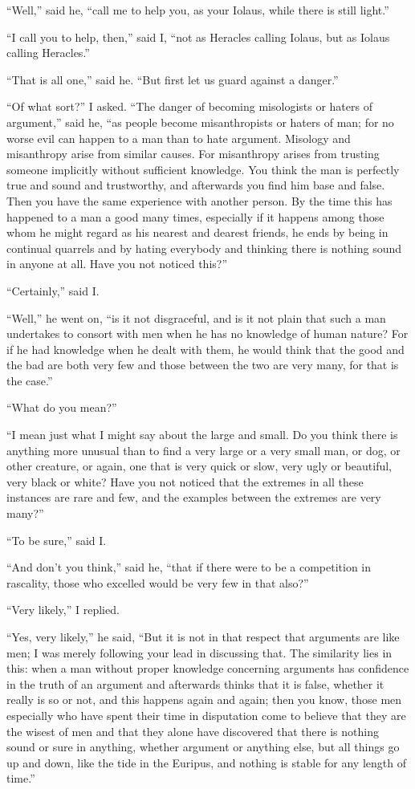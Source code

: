 \documentclass[letterpaper,12pt]{article}
\newcommand{\stephpag}[1]{\marginnote{\small\itshape\fontfamily{ppl}\selectfont #1}}
\begin{document}
\begin{drama}
``Well,'' said he, ``call me to help you, as your Iolaus, while there is still light.''
 
``I call you to help, then,'' said I, ``not as Heracles calling Iolaus, but as Iolaus calling Heracles.''
 
``That is all one,'' said he. ``But first let us guard against a danger.''
 
``Of what sort?'' I asked. \stephpag{d} ``The danger of becoming misologists or haters of argument,'' said he, ``as people become misanthropists or haters of man; for no worse evil can happen to a man than to hate argument. Misology and misanthropy arise from similar causes. For misanthropy arises from trusting someone implicitly without sufficient knowledge. You think the man is perfectly true and sound and trustworthy, and afterwards you find him base and false. Then you have the same experience with another person. By the time this has happened to a man a good many times, especially if it happens among those whom he might regard as his nearest \stephpag{e} and dearest friends, he ends by being in continual quarrels and by hating everybody and thinking there is nothing sound in anyone at all. Have you not noticed this?''
 
``Certainly,'' said I.
 
``Well,'' he went on, ``is it not disgraceful, and is it not plain that such a man undertakes to consort with men when he has no knowledge of human nature? For if he had knowledge when he dealt with them, he would think that the good \stephpag{90 a} and the bad are both very few and those between the two are very many, for that is the case.''
 
``What do you mean?''
 
``I mean just what I might say about the large and small. Do you think there is anything more unusual than to find a very large or a very small man, or dog, or other creature, or again, one that is very quick or slow, very ugly or beautiful, very black or white? Have you not noticed that the extremes in all these instances are rare and few, and the examples between the extremes are very many?''
 
``To be sure,'' said I.
 
``And don't you think,'' \stephpag{b} said he, ``that if there were to be a competition in rascality, those who excelled would be very few in that also?''
 
``Very likely,'' I replied.
 
``Yes, very likely,'' he said, ``But it is not in that respect that arguments are like men; I was merely following your lead in discussing that. The similarity lies in this: when a man without proper knowledge concerning arguments has confidence in the truth of an argument and afterwards thinks that it is false, whether it really is so or not, and this happens again and again; then you know, those men especially who \stephpag{c} have spent their time in disputation come to believe that they are the wisest of men and that they alone have discovered that there is nothing sound or sure in anything, whether argument or anything else, but all things go up and down, like the tide in the Euripus, and nothing is stable for any length of time.''
 

\end{drama}
\end{document}
